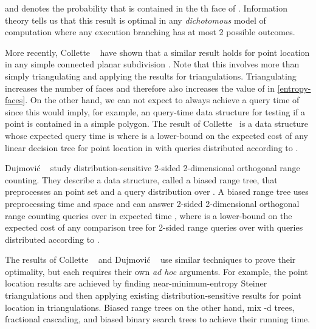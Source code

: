 \documentclass{patmorin}
\begin{document}
and  denotes the probability that  is contained in the th face
of  \cite{acmr00,amm00,amm01a,amm01b,ammw07,i01,i04}.  Information
theory tells us that this result is optimal in any \emph{dichotomous}
model of computation where any execution branching has at most 2 possible
outcomes.

More recently, Collette \etal\ \cite{cdilm08,cdilm09} have shown that a
similar result holds for point location in any simple connected planar
subdivision .  Note that this involves more than simply triangulating
 and applying the results for triangulations.  Triangulating 
increases the number of faces and therefore also increases the value of
 in \eqref{entropy-faces}.  On the other hand, we can not expect to
always achieve a query time of  since this would imply, for
example, an  query-time data structure for testing if a point
is contained in a simple polygon.  The result of Collette \etal\  is
a data structure whose expected query time is  where 
is a lower-bound on the expected cost of any linear decision tree for
point location in  with queries distributed according to .

Dujmovi\'c \etal\ \cite{dhm09} study distribution-sensitive 2-sided
2-dimensional orthogonal range counting.  They describe a data
structure, called a biased range tree, that preprocesses an  point
set  and a query distribution  over .  A biased
range tree uses  preprocessing time and space and can
answer 2-sided 2-dimensional orthogonal range counting queries over
 in expected time , where  is a lower-bound on the
expected cost of any comparison tree for 2-sided range queries over 
with queries distributed according to .

The results of Collette \etal\ \cite{cdilm08,cdilm09} and Dujmovi\'c
\etal\ \cite{dhm09} use similar techniques to prove their optimality,
but each requires their own \textit{ad hoc} arguments.  For example, the point
location results are achieved by finding near-minimum-entropy Steiner
triangulations and then applying existing distribution-sensitive results
for point location in triangulations.  Biased range trees on the other
hand, mix -d trees, fractional cascading, and biased binary search
trees to achieve their running time.
\end{document}
